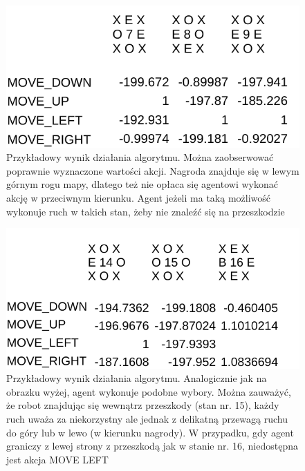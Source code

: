 \begin{figure}[H]
    \centering
    \includegraphics[scale=0.7]{wynik1}
    \caption{Przykładowy wynik działania algorytmu. Można zaobserwować poprawnie wyznaczone wartości akcji. Nagroda 
znajduje się w lewym górnym rogu mapy, dlatego też nie opłaca się agentowi wykonać akcję w przeciwnym kierunku. Agent 
jeżeli ma taką możliwość wykonuje ruch w takich stan, żeby nie znaleźć się na przeszkodzie}
    \label{fig:wynik1}
\end{figure}

\begin{figure}[H]
    \centering
    \includegraphics[scale=0.7]{wynik2}
    \caption{Przykładowy wynik działania algorytmu. Analogicznie jak na obrazku wyżej, agent wykonuje podobne wybory. 
Można 
zauważyć, że robot znajdując się wewnątrz przeszkody (stan nr. 15), każdy ruch uważa za niekorzystny ale jednak z 
delikatną przewagą ruchu do góry lub w lewo (w kierunku nagrody). W przypadku, gdy agent graniczy z lewej strony z 
przeszkodą 
jak w stanie nr. 16, niedostępna jest akcja MOVE LEFT}
    \label{fig:wynik2}
\end{figure}

